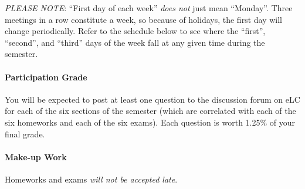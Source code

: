 \documentclass{article}
\begin{document}
    \emph{PLEASE NOTE}: ``First day of each week'' \emph{does not} just mean ``Monday''. Three meetings in a row constitute a week, so because of holidays, the first day will change periodically. Refer to the schedule below to see where the ``first'', ``second'', and ``third'' days of the week fall at any given time during the semester.

  \paragraph{Participation Grade}
    You will be expected to post at least one question to the discussion forum on eLC for each of the six sections of the semester (which are correlated with each of the six homeworks and each of the six exams). Each question is worth 1.25\% of your final grade.

  \paragraph{Make-up Work}
    Homeworks and exams \emph{will not be accepted late}.
\end{document}
